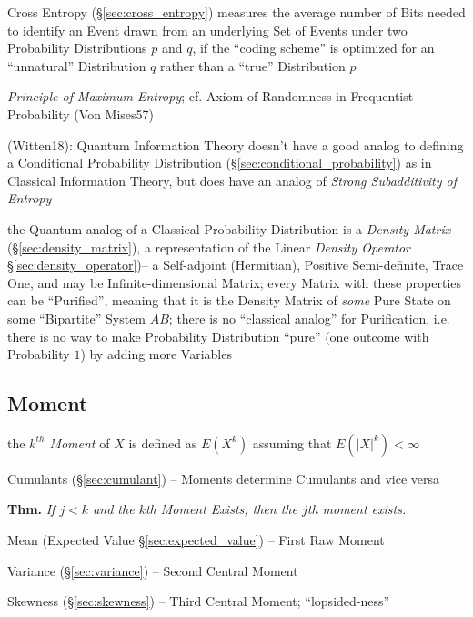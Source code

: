 Cross Entropy (\S\ref{sec:cross_entropy}) measures the average number of Bits
needed to identify an Event drawn from an underlying Set of Events under two
Probability Distributions $p$ and $q$, if the ``coding scheme'' is optimized for
an ``unnatural'' Distribution $q$ rather than a ``true'' Distribution $p$

\emph{Principle of Maximum Entropy}; cf. Axiom of Randomness in Frequentist
Probability (Von Mises57)

(Witten18): Quantum Information Theory doesn't have a good analog to defining a
Conditional Probability Distribution (\S\ref{sec:conditional_probability}) as in
Classical Information Theory, but does have an analog of \emph{Strong
  Subadditivity of Entropy}

the Quantum analog of a Classical Probability Distribution is a \emph{Density
  Matrix} (\S\ref{sec:density_matrix}), a representation of the Linear
\emph{Density Operator} \S\ref{sec:density_operator})-- a Self-adjoint
(Hermitian), Positive Semi-definite, Trace One, and may be Infinite-dimensional
Matrix; every Matrix with these properties can be ``Purified'', meaning that it
is the Density Matrix of \emph{some} Pure State on some ``Bipartite'' System
$AB$; there is no ``classical analog'' for Purification, i.e. there is no way to
make Probability Distribution ``pure'' (one outcome with Probability $1$) by
adding more Variables



\subsection{Moment}\label{sec:moment}

the \emph{$k^{th}$ Moment} of $X$ is defined as $E(X^k)$ assuming that
$E(|X|^k) < \infty$

\fist Cumulants (\S\ref{sec:cumulant}) -- Moments determine Cumulants and vice
versa

\textbf{Thm.} \emph{If $j < k$ and the $k$th Moment Exists, then the $j$th
  moment exists.}

Mean (Expected Value \S\ref{sec:expected_value}) -- First Raw Moment

Variance (\S\ref{sec:variance}) -- Second Central Moment

Skewness (\S\ref{sec:skewness}) -- Third Central Moment; ``lopsided-ness''

